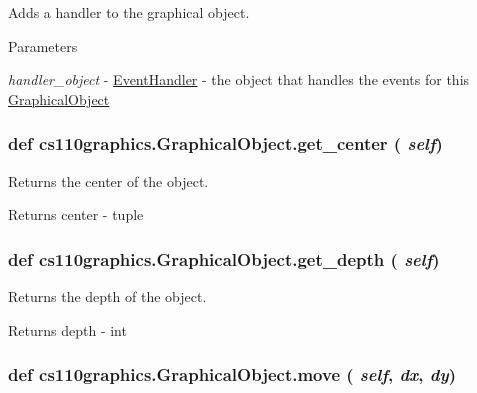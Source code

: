 Adds a handler to the graphical object. 
\begin{DoxyParams}{Parameters}
\item[{\em handler\_\-object}]-\/ \hyperlink{classcs110graphics_1_1EventHandler}{EventHandler} -\/ the object that handles the events for this \hyperlink{classcs110graphics_1_1GraphicalObject}{GraphicalObject} \end{DoxyParams}
\hypertarget{classcs110graphics_1_1GraphicalObject_a062789c4cc9de38af32dcc4ff2058607}{
\subsubsection[{get\_\-center}]{\setlength{\rightskip}{0pt plus 5cm}def cs110graphics.GraphicalObject.get\_\-center ( {\em self})}}
\label{classcs110graphics_1_1GraphicalObject_a062789c4cc9de38af32dcc4ff2058607}


Returns the center of the object. \begin{DoxyReturn}{Returns}
center -\/ tuple 
\end{DoxyReturn}
\hypertarget{classcs110graphics_1_1GraphicalObject_a6d9f5718cd0cf249e0d2842971bae17f}{
\subsubsection[{get\_\-depth}]{\setlength{\rightskip}{0pt plus 5cm}def cs110graphics.GraphicalObject.get\_\-depth ( {\em self})}}
\label{classcs110graphics_1_1GraphicalObject_a6d9f5718cd0cf249e0d2842971bae17f}


Returns the depth of the object. \begin{DoxyReturn}{Returns}
depth -\/ int 
\end{DoxyReturn}
\hypertarget{classcs110graphics_1_1GraphicalObject_aa64d270fb83efa4a54e1a7953512f9cd}{
\subsubsection[{move}]{\setlength{\rightskip}{0pt plus 5cm}def cs110graphics.GraphicalObject.move ( {\em self}, \/   {\em dx}, \/   {\em dy})}}
\label{classcs110graphics_1_1GraphicalObject_aa64d270fb83efa4a54e1a7953512f9cd}


